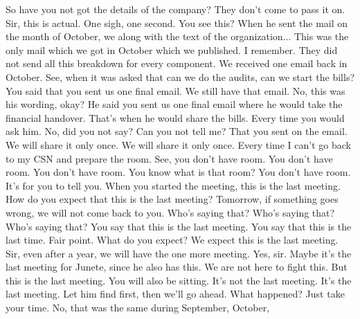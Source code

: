 So have you not got the details of the company?
They don't come to pass it on.
Sir, this is actual.
One sigh, one second.
You see this?
When he sent the mail on the month of October,
we along with the text of the organization...
This was the only mail which we got in October which we published.
I remember.
They did not send all this breakdown for every component.
We received one email back in October.
See, when it was asked that can we do the audits, can we start the bills?
You said that you sent us one final email.
We still have that email.
No, this was his wording, okay?
He said you sent us one final email where he would take the financial handover.
That's when he would share the bills.
Every time you would ask him.
No, did you not say?
Can you not tell me?
That you sent on the email.
We will share it only once.
We will share it only once.
Every time I can't go back to my CSN and prepare the room.
See, you don't have room.
You don't have room.
You don't have room.
You know what is that room?
You don't have room.
It's for you to tell you.
When you started the meeting, this is the last meeting.
How do you expect that this is the last meeting?
Tomorrow, if something goes wrong, we will not come back to you.
Who's saying that?
Who's saying that?
Who's saying that?
You say that this is the last meeting.
You say that this is the last time.
Fair point.
What do you expect?
We expect this is the last meeting.
Sir, even after a year, we will have the one more meeting.
Yes, sir.
Maybe it's the last meeting for Junete, since he also has this.
We are not here to fight this.
But this is the last meeting.
You will also be sitting.
It's not the last meeting.
It's the last meeting.
Let him find first, then we'll go ahead.
What happened?
Just take your time.
No, that was the same during September, October, 

